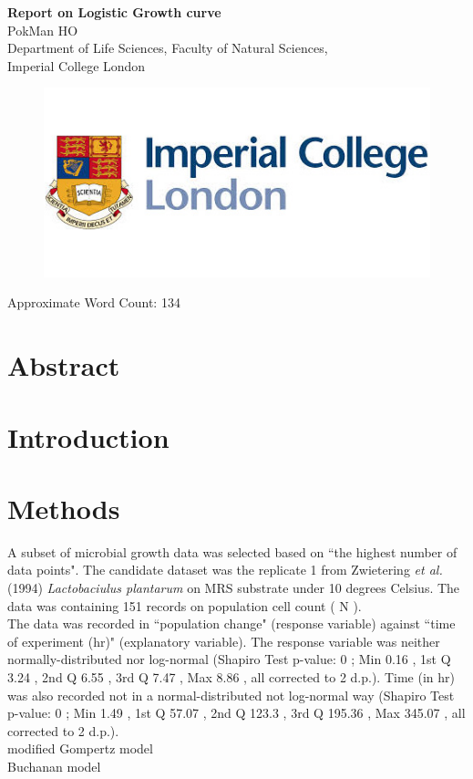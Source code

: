 \documentclass[a4paper, 11pt]{article}
\title{\ReportTitle}
\author{\ReportAuthor (CID: 01786076)}
\date{}
\newcommand{\ReportTitle}{Report on Logistic Growth curve} %
\newcommand{\ReportAuthor}{PokMan HO}
\newcommand{\ReportAffil}{Department of Life Sciences, Faculty of Natural Sciences,\\Imperial College London}
\begin{document}
	\begin{center}
		\Huge\textbf{\ReportTitle}\\
		\LARGE\ReportAuthor\\
		\Large\ReportAffil
	\end{center}
	\begin{figure}[h]
		\centering\includegraphics[width=\linewidth]{icl.jpg}
	\end{figure}
	\begin{flushright}
		\Large Approximate Word Count: %
134
	\end{flushright}
	\clearpage
	
	\maketitle
	\section*{Abstract}
	
	
	\section*{Introduction}
	
	
	\section*{Methods}
	A subset of microbial growth data was selected based on ``the highest number of data points".  The candidate dataset was the replicate %
1
	 from Zwietering \textit{et al.}(1994)\autocite{zwietering1994modeling} \textit{%
Lactobaciulus plantarum
	}on %
MRS
	 substrate under %
10
	 degrees Celsius.  The data was containing %
151
	 records on population cell count (%
N
).\\
	The data was recorded in ``population change" (response variable) against ``time of experiment (hr)" (explanatory variable).  The response variable was neither normally-distributed nor log-normal (Shapiro Test p-value: %
0
	; Min
0.16
	, 1st Q
3.24
	, 2nd Q
6.55
	, 3rd Q
7.47
	, Max
8.86
	, all corrected to 2 d.p.).  Time (in hr) was also recorded not in a normal-distributed not log-normal way (Shapiro Test p-value: %
0
	; Min
1.49
	, 1st Q
57.07
	, 2nd Q
123.3
	, 3rd Q
195.36
	, Max
345.07
	, all corrected to 2 d.p.).\\
	modified Gompertz model\autocite{zwietering1994modeling}\\
	Buchanan model\autocite{buchanan1993differentiation}
\end{document}
